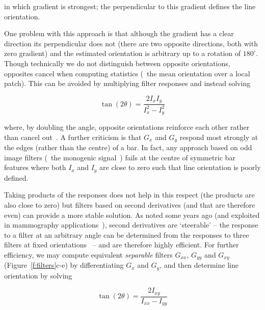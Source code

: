 \documentclass[10pt,twocolumn,letterpaper]{article}
\newcommand{\fref}[1]{Figure~\ref{#1}}
\def\Gx{G_x}
\def\Gy{G_y}
\def\Gxx{G_{xx}}
\def\Gxy{G_{xy}} \def\Gyx{G_{yx}}
\def\Gyy{G_{yy}}
\def\Ix{I_x}
\def\Iy{I_y}
\def\Ixx{I_{xx}}
\def\Ixy{I_{xy}}
\def\Iyy{I_{yy}}
\begin{document}
\noindent in which gradient is strongest; the perpendicular to this gradient defines the line orientation.


One problem with this approach is that although the gradient has a clear direction its perpendicular does not (there are two opposite directions, both with zero gradient) and the estimated orientation is arbitrary up to a rotation of $180^\circ$. Though technically we do not distinguish between opposite orientations, opposites cancel when computing statistics (\eg~the mean orientation over a local patch). This can be avoided by multiplying filter responses and instead solving

\begin{equation}
\tan(2\theta) = \frac{2\Ix\Iy}{\Ix^2-\Iy^2}
\label{e:1dsqr}
\end{equation}

\noindent where, by doubling the angle, opposite orientations reinforce each other rather than cancel out~\cite{Mardia_Jupp_00}. A further criticism is that $\Gx$ and $\Gy$ respond most strongly at the edges (rather than the centre) of a bar. In fact, any approach based on odd image filters (\eg~the monogenic signal~\cite{Felsberg_Sommer_TSP01}) fails at the centre of symmetric bar features where both $\Ix$ and $\Iy$ are close to zero such that line orientation is poorly defined.

Taking products of the responses does not help in this respect (the products are also close to zero) but filters based on second derivatives (and that are therefore even) can provide a more stable solution. As noted some years ago (and exploited in mammography applications~\cite{Karssemeijer_teBrake_TMI96}), second derivatives are `steerable' -- the response to a filter at an arbitrary angle can be determined from the responses to three filters at fixed orientations~\cite{Freeman_Adelson_TPAMI91,Koenderink_vanDoorn_TPAMI92} -- and are therefore highly efficient. For further efficiency, we may compute equivalent \emph{separable} filters $\Gxx$, $\Gyy$ and $\Gxy$ (\fref{f:filters}c-e) by differentiating $\Gx$ and $\Gy$, and then determine line orientation by solving

\begin{equation}
\tan(2\theta) = \frac{2\Ixy}{\Ixx-\Iyy}
\label{e:2d}
\end{equation}
\end{document}
